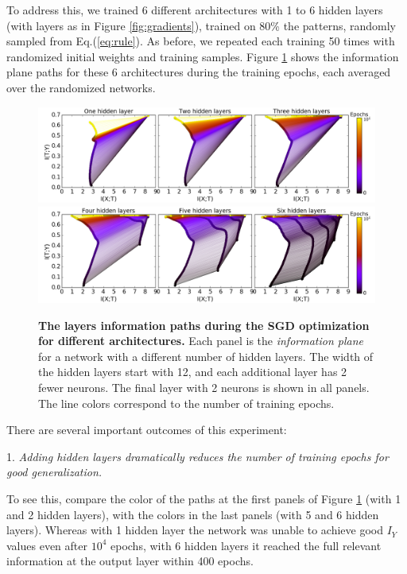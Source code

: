\documentclass[11pt]{article}
\begin{document}
To address this, we trained 6 different architectures with
1 to 6  hidden layers (with layers as in Figure \ref{fig:gradients}), trained on 80\%  
the patterns, randomly sampled from Eq.(\ref{eq:rule}). 
As before, we repeated each training 50 times with randomized initial weights and training samples. 
Figure \ref{layers_inf} shows the information plane paths for these 6 architectures during the training epochs, each averaged over the randomized networks. 

\begin{figure}[t]
\begin{centering}
\includegraphics[width=\textwidth, scale = 0.5]{plot_all_percent3.png}
\includegraphics[width=\textwidth, scale = 0.5]{plot_all_percent6.png}
\par\end{centering}
\caption{\textbf{The layers information paths during the SGD
optimization for different architectures.} 
Each panel is the \textit{information plane} 
for a network with a different number of hidden
layers. The width of the hidden layers start with 12, and each additional layer has 2 fewer neurons. 
The final layer with 2 neurons is shown in all panels.  
The line colors correspond to the number of training epochs. 
}
\vskip -0.1in
\label{layers_inf}
\end{figure}

There are several important outcomes of this experiment:

1. \emph{Adding hidden layers dramatically reduces the number of training epochs for good generalization.}

To see this, compare the color of the paths at the first panels of Figure \ref{layers_inf} (with 1 and 2 hidden layers), with the colors in the last panels (with 5 and 6 hidden layers). Whereas with 1 hidden layer the network was unable to achieve good $I_Y$ values even after $10^4$ epochs, with 6 hidden layers it reached the full relevant information at the output layer within 400 epochs.
  
\end{document}
